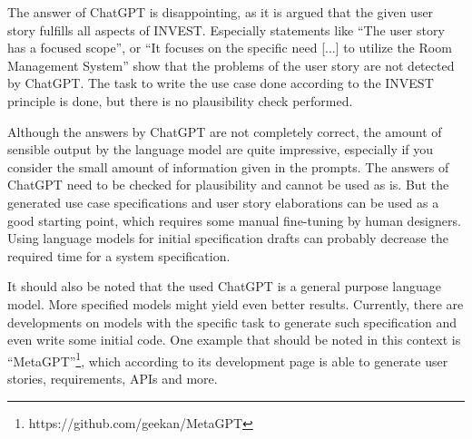 \documentclass[conference,onecolumn]{IEEEtran}
\begin{document}
The answer of ChatGPT is disappointing, as it is argued that the given user story fulfills all aspects of INVEST. Especially statements like ``The user story has a focused scope'', or ``It focuses on the specific need [...] to utilize the Room Management System'' show that the problems of the user story are not detected by ChatGPT. The task to write the use case done according to the INVEST principle is done, but there is no plausibility check performed.

Although the answers by ChatGPT are not completely correct, the amount of sensible output by the language model are quite impressive, especially if you consider the small amount of information given in the prompts.
The answers of ChatGPT need to be checked for plausibility and cannot be used as is. But the generated use case specifications and user story elaborations can be used as a good starting point, which requires some manual fine-tuning by human designers. Using language models for initial specification drafts can probably decrease the required time for a system specification.

It should also be noted that the used ChatGPT is a general purpose language model. More specified models might yield even better results.
Currently, there are developments on models with the specific task to generate such specification and even write some initial code. One example that should be noted in this context is ``MetaGPT''\footnote{https://github.com/geekan/MetaGPT}, which according to its development page is able to generate user stories, requirements, APIs and more.
\end{document}
